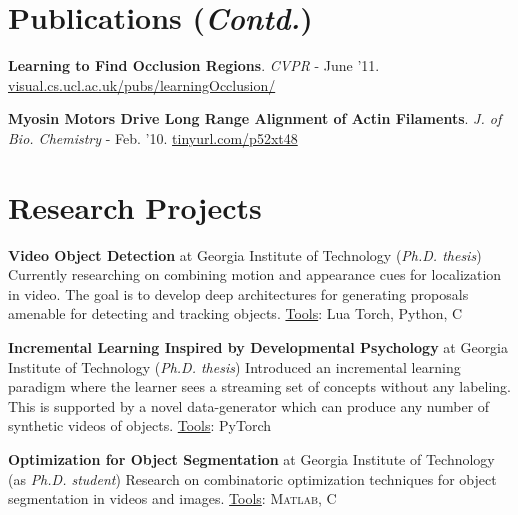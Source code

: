 \documentclass[10pt,twoside,a4paper]{article}
\newif\ifdetail
\newcommand\CPP{C\nolinebreak[4]\hspace{-.05em}\raisebox{.4ex}{\relsize{-3}{\textbf{++}}}}
\begin{document}
\section{Publications {\small(\textit{Contd.})}}
{
\small
\fi

\textbf{Learning to Find Occlusion Regions}. \ifdetail ($1^{\text{st}}$ author) \newline \fi \textit{\ifdetail IEEE Conference on Computer Vision and Pattern Recognition (CVPR) \else CVPR \fi} - June '11. \href{http://visual.cs.ucl.ac.uk/pubs/learningOcclusion/}{visual.cs.ucl.ac.uk/pubs/learningOcclusion/}

\textbf{Myosin Motors Drive Long Range Alignment of Actin Filaments}. \ifdetail ($3^{\text{rd}}$ author) \newline \fi \textit{\ifdetail Journal of Biological Chemistry \else J. of Bio. Chemistry \fi} - Feb. '10. \href{http://www.jbc.org/content/285/7/4964.abstract}{\ifdetail www.jbc.org/content/285/7/4964.abstract \else tinyurl.com/p52xt48 \fi}
}

\ifdetail
\else
\vspace{-0.4cm}
\fi


\section{Research Projects}
\textbf{Video Object Detection} at Georgia Institute of Technology (\textit{Ph.D. thesis}) \newline
Currently researching on combining motion and appearance cues for localization in video. The goal is to develop deep architectures for generating proposals amenable for detecting and tracking objects. \underline{Tools}: Lua Torch, Python, \CPP

\textbf{Incremental Learning Inspired by Developmental Psychology} at Georgia Institute of Technology (\textit{Ph.D. thesis}) \newline
Introduced an incremental learning paradigm where the learner sees a streaming set of concepts without any labeling. This is supported by a novel data-generator which can produce any number of synthetic videos of objects. \underline{Tools}: PyTorch

\textbf{Optimization for Object Segmentation} at Georgia Institute of Technology (as \textit{Ph.D. student}) \newline
Research on combinatoric optimization techniques for object segmentation in videos and images. \underline{Tools}: \textsc{Matlab}, \CPP
\end{document}
